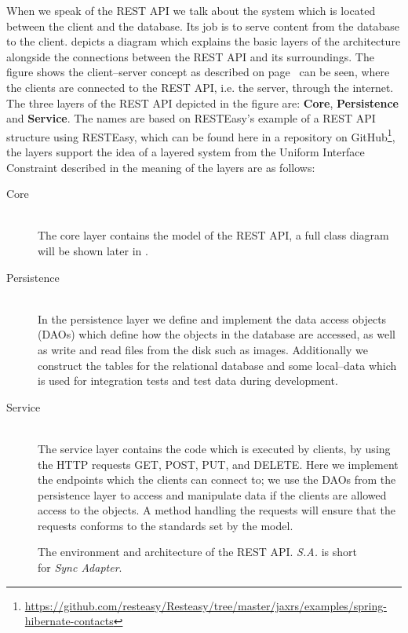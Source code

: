 When we speak of the REST API we talk about the system which is located between the client and the database.
Its job is to serve content from the database to the client.
 depicts a diagram which explains the basic layers of the architecture alongside the connections between the REST API and its surroundings.
The figure shows the client--server concept as described on page~\pageref{client-server-rest} can be seen, where the clients are connected to the REST API, i.e. the server, through the internet.
The three layers of the REST API depicted in the figure are: \textbf{Core}, \textbf{Persistence} and \textbf{Service}.
The names are based on RESTEasy's example of a REST API structure using RESTEasy, which can be found here in a repository on GitHub\footnote{\url{https://github.com/resteasy/Resteasy/tree/master/jaxrs/examples/spring-hibernate-contacts}}, the layers support the idea of a layered system from the Uniform Interface Constraint described in  the meaning of the layers are as follows:
\begin{description}
    \item[Core] \hfill \\
    The core layer contains the model of the REST API, a full class diagram will be shown later in .

    \item[Persistence] \hfill \\
    In the persistence layer we define and implement the data access objects (DAOs) which define how the objects in the database are accessed, as well as write and read files from the disk such as images.
    Additionally we construct the tables for the relational database and some local--data which is used for integration tests and test data during development.

    \item[Service] \hfill \\
    The service layer contains the code which is executed by clients, by using the HTTP requests GET, POST, PUT, and DELETE.
    Here we implement the endpoints which the clients can connect to; we use the DAOs from the persistence layer to access and manipulate data if the clients are allowed access to the objects.
    A method handling the requests will ensure that the requests conforms to the standards set by the model.
\end{description}

\begin{figure}[h]
    \centering
    
    \caption{The environment and architecture of the REST API. \textit{S.A.} is short for \textit{Sync Adapter}.}\label{fig:rest-architecture}
\end{figure}

